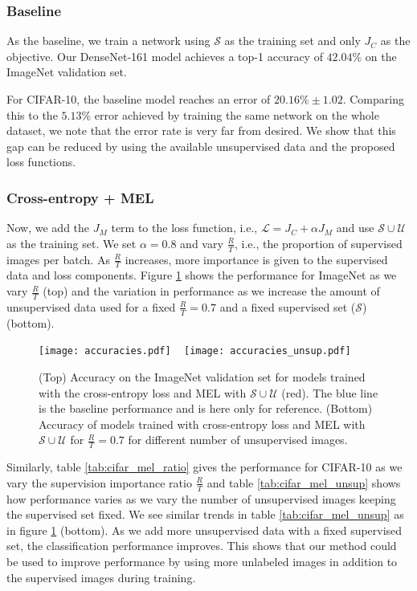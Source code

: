 \subsubsection{Baseline}
As the baseline, we train a network using $\mathcal{S}$ as the training set and only $J_C$ as the
objective. Our DenseNet-161 model achieves a top-1 accuracy of $42.04\%$ on the ImageNet validation
set. 

For CIFAR-10, the baseline model reaches an error of $20.16\% \pm 1.02$. Comparing this to the $5.13\%$
error achieved by training the same network on the whole dataset, we note that the error rate is
very far from desired. We show that this gap can be reduced by using the available unsupervised data and
the proposed loss functions.  

\subsubsection{Cross-entropy + MEL}
Now, we add the $J_M$ term to the loss function, i.e., $\mathcal{L} = J_C + \alpha
J_M$ and use $\mathcal{S} \cup \mathcal{U}$ as the training set. We set $\alpha = 0.8$ and vary
$\frac{R}{T}$, i.e., the proportion of supervised images per batch. As $\frac{R}{T}$ increases, more
importance is given to the supervised data and loss components. Figure \ref{fig:acc} shows
the performance for ImageNet as we vary $\frac{R}{T}$ (top) and the variation in performance as we
increase the amount of unsupervised data used for a fixed $\frac{R}{T} = 0.7$ and a fixed supervised
set ($\mathcal{S}$) (bottom). 
\begin{figure}
	\centering
	{
		\texttt{[image: accuracies.pdf]}
	~
		\texttt{[image: accuracies\_unsup.pdf]}
	}
		\caption{(Top) Accuracy on the ImageNet validation set for models trained with the cross-entropy
		loss and MEL with $\mathcal{S}\cup\mathcal{U}$ (red). The blue line is the baseline
		performance and is here only for reference. (Bottom) Accuracy of models trained with
		cross-entropy loss and MEL with $\mathcal{S}\cup\mathcal{U}$ for $\frac{R}{T} = 0.7$ for
	different number of unsupervised images.}
		\label{fig:acc}
\end{figure}

Similarly, table \ref{tab:cifar_mel_ratio} gives the performance for CIFAR-10 as we vary the
supervision importance ratio $\frac{R}{T}$ and table \ref{tab:cifar_mel_unsup} shows how performance
varies as we vary the number of unsupervised images keeping the supervised set fixed. We see similar
trends in table \ref{tab:cifar_mel_unsup} as in figure \ref{fig:acc} (bottom). As we add more
unsupervised data with a fixed supervised set, the classification performance improves. This shows
that our method could be used to improve performance by using more unlabeled images in addition to
the supervised images during training.

